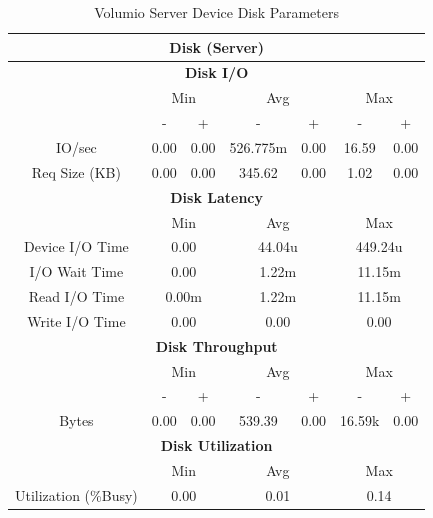 \documentclass[11pt,a4paper,headinclude=false,footinclude=false]{scrreprt}
\begin{document}
\begin{table}[H]
\centering
    \begin{tabular}{||c|c|c|c|c|c|c||}
    \hline
    \multicolumn{7}{|c|}{\textbf{Disk (Server)}} \\
    \hline
    \multicolumn{7}{|c|}{\textbf{Disk I/O}} \\
    \hline\hline
      & \multicolumn{2}{|c|}{Min} & \multicolumn{2}{|c|}{Avg} & \multicolumn{2}{|c|}{Max} \\
    \hline
      & - & + & - & + & - & + \\
    \hline
    IO/sec & 0.00 & 0.00 & 526.775m & 0.00 & 16.59 & 0.00 \\
    \hline
    Req Size (KB) & 0.00 & 0.00 & 345.62 & 0.00 & 1.02 & 0.00 \\
    \hline\hline
    \multicolumn{7}{|c|}{\textbf{Disk Latency}} \\
    \hline\hline
      & \multicolumn{2}{|c|}{Min} & \multicolumn{2}{|c|}{Avg} & \multicolumn{2}{|c|}{Max} \\
    \hline
    Device I/O Time  & \multicolumn{2}{|c|}{0.00} & \multicolumn{2}{|c|}{44.04u} & \multicolumn{2}{|c|}{449.24u} \\
    \hline
    I/O Wait Time  & \multicolumn{2}{|c|}{0.00} & \multicolumn{2}{|c|}{1.22m} & \multicolumn{2}{|c|}{11.15m} \\
    \hline
    Read I/O Time  & \multicolumn{2}{|c|}{0.00m} & \multicolumn{2}{|c|}{1.22m} & \multicolumn{2}{|c|}{11.15m} \\
    \hline
    Write I/O Time  & \multicolumn{2}{|c|}{0.00} & \multicolumn{2}{|c|}{0.00} & \multicolumn{2}{|c|}{0.00} \\
    \hline\hline
    \multicolumn{7}{|c|}{\textbf{Disk Throughput}} \\
    \hline\hline
      & \multicolumn{2}{|c|}{Min} & \multicolumn{2}{|c|}{Avg} & \multicolumn{2}{|c|}{Max} \\
    \hline
      & - & + & - & + & - & + \\
    \hline
    Bytes & 0.00 & 0.00 & 539.39 & 0.00 & 16.59k & 0.00 \\
    \hline\hline
    \multicolumn{7}{|c|}{\textbf{Disk Utilization}} \\
    \hline\hline
      & \multicolumn{2}{|c|}{Min} & \multicolumn{2}{|c|}{Avg} & \multicolumn{2}{|c|}{Max} \\
    \hline
    Utilization (\%Busy)  & \multicolumn{2}{|c|}{0.00} & \multicolumn{2}{|c|}{0.01} & \multicolumn{2}{|c|}{0.14} \\
    \hline\hline
    \end{tabular}
    \caption{Volumio Server Device Disk Parameters}
    \label{VolumioserverDiskTab}
\end{table}
\end{document}
